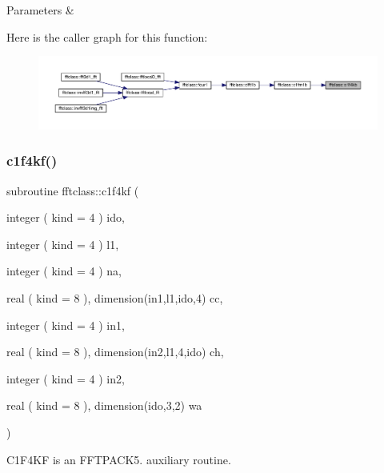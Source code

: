 \begin{DoxyParams}{Parameters}
{\em } & \\
\hline
\end{DoxyParams}
Here is the caller graph for this function\+:\nopagebreak
\begin{figure}[H]
\begin{center}
\leavevmode
\includegraphics[width=350pt]{namespacefftclass_a16b67c4056cd4bef03d70d6289f60954_icgraph}
\end{center}
\end{figure}
\mbox{\label{namespacefftclass_a4121c0b7de23d7df058852fb75a9a31a}} 
\subsubsection{\texorpdfstring{c1f4kf()}{c1f4kf()}}
{\footnotesize\ttfamily subroutine fftclass\+::c1f4kf (\begin{DoxyParamCaption}\item[{integer ( kind = 4 )}]{ido,  }\item[{integer ( kind = 4 )}]{l1,  }\item[{integer ( kind = 4 )}]{na,  }\item[{real ( kind = 8 ), dimension(in1,l1,ido,4)}]{cc,  }\item[{integer ( kind = 4 )}]{in1,  }\item[{real ( kind = 8 ), dimension(in2,l1,4,ido)}]{ch,  }\item[{integer ( kind = 4 )}]{in2,  }\item[{real ( kind = 8 ), dimension(ido,3,2)}]{wa }\end{DoxyParamCaption})}



C1\+F4\+KF is an F\+F\+T\+P\+A\+C\+K5. auxiliary routine. 

